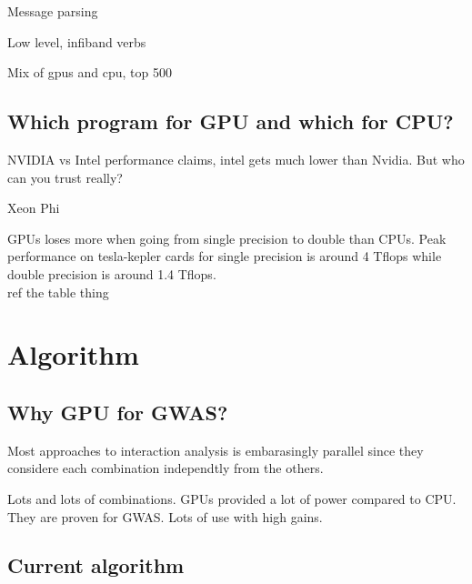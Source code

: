 \documentclass[10pt,a4paper]{article}
\begin{document}
Message parsing

Low level, infiband verbs

Mix of gpus and cpu, top 500

\subsection{Which program for GPU and which for CPU?}
NVIDIA vs Intel performance claims, intel gets much lower than Nvidia. But who can you trust really?

Xeon Phi

GPUs loses more when going from single precision to double than CPUs. Peak performance on tesla-kepler cards for single precision is around 4 Tflops while double precision is around 1.4 Tflops. \cite{nvtesla}\\ ref the table thing

\section{Algorithm}


\subsection{Why GPU for GWAS?}
Most approaches to interaction analysis is embarasingly parallel since they considere each combination independtly from the others. 

Lots and lots of combinations. GPUs provided a lot of power compared to CPU. They are proven for GWAS. Lots of use with high gains.

\subsection{Current algorithm}




\end{document}
